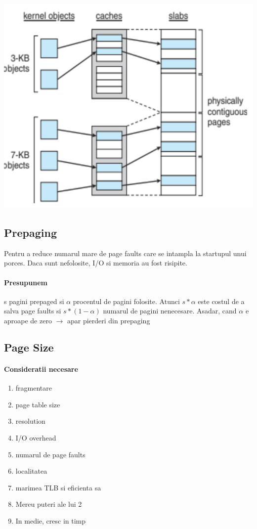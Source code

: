 \documentclass{article}
\begin{document}
\begin{center}
    \includegraphics[scale=0.4]{39-slab.png}
\end{center}

\subsection*{Prepaging}
Pentru a reduce numarul mare de page faults care se intampla la startupul unui porces. Daca sunt nefolosite, I/O si memoria au fost risipite.
\paragraph*{Presupunem} s pagini prepaged si $\alpha$ procentul de pagini folosite. Atunci $s*\alpha$ este costul de a salva page faults si $s*(1-\alpha)$ numarul de pagini nenecesare. Asadar, cand $\alpha$ e aproape de zero $\rightarrow$ apar pierderi din prepaging

\subsection*{Page Size}
\paragraph*{Consideratii necesare}
\begin{enumerate}
    \item fragmentare
    \item page table size
    \item resolution
    \item I/O overhead
    \item numarul de page faults
    \item localitatea
    \item marimea TLB si eficienta sa
    \item Mereu puteri ale lui 2
    \item In medie, cresc in timp
\end{enumerate}
\end{document}
